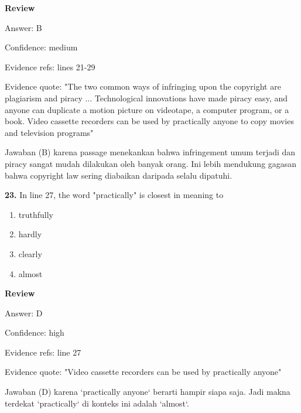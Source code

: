 \documentclass[12pt]{article}
\begin{document}
\par
\begingroup
\setlength{\parskip}{0pt}
\setlength{\parindent}{0pt}
\textbf{Review}\par
Answer: B\par
Confidence: medium\par
Evidence refs: lines 21-29\par
Evidence quote: "The two common ways of infringing upon the copyright are plagiarism and piracy ... Technological innovations have made piracy easy, and anyone can duplicate a motion picture on videotape, a computer program, or a book. Video cassette recorders can be used by practically anyone to copy movies and television programs"\par
Jawaban (B) karena passage menekankan bahwa infringement umum terjadi dan piracy sangat mudah dilakukan oleh banyak orang. Ini lebih mendukung gagasan bahwa copyright law sering diabaikan daripada selalu dipatuhi.\par
\endgroup
\par
\vspace{0.25\baselineskip}
\noindent\textbf{23.} In line 27, the word "practically" is closest in meaning to
\begin{enumerate}[label=(\Alph*),leftmargin=*,itemsep=0.2em]
\item truthfully
\item hardly
\item clearly
\item almost
\end{enumerate}
\par
\begingroup
\setlength{\parskip}{0pt}
\setlength{\parindent}{0pt}
\textbf{Review}\par
Answer: D\par
Confidence: high\par
Evidence refs: line 27\par
Evidence quote: "Video cassette recorders can be used by practically anyone"\par
Jawaban (D) karena `practically anyone` berarti hampir siapa saja. Jadi makna terdekat `practically` di konteks ini adalah `almost`.\par
\endgroup
\par
\vspace{0.25\baselineskip}
\end{document}

